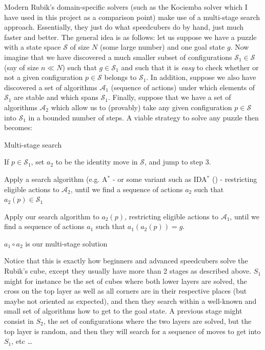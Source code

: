 \label{Theory:RCMSS}
Modern Rubik's domain-specific solvers (such as the Kociemba solver which I have used in this project as a comparison point) make use of a multi-stage search approach. Essentially, they just do what speedcubers do by hand, just much faster and better. The general idea is as follows: let us suppose we have a puzzle with a state space $\mathcal{S}$ of size $N$ (some large number) and one goal state $g$. Now imagine that we have discovered a much smaller subset of configurations $\mathcal{S}_{1} \in \mathcal{S}$ (say of size $n \ll N$) such that $g \in \mathcal{S}_{1}$ and such that it is \textit{easy} to check whether or not a given configuration $p \in \mathcal{S}$ belongs to $\mathcal{S}_{1}$. In addition, suppose we also have discovered a set of algorithms $\mathcal{A}_{1}$ (sequence of actions) under which elements of $\mathcal{S}_{1}$ are stable and which spans $\mathcal{S}_{1}$. Finally, suppose that we have a set of algorithms $\mathcal{A}_{2}$ which allow us to (provably) take any given configuration $p \in \mathcal{S}$ into $\mathcal{S}_{1}$ in a bounded number of steps. A viable strategy to solve any puzzle then becomes:
\begin{titlemize}{Multi-stage search}
\item If $p \in \mathcal{S}_{1}$, set $a_{2}$ to be the identity move in $\mathcal{S}$, and jump to step 3.
\item Apply a search algorithm (e.g. A$^{*}$ - or some variant such as IDA$^{*}$ (\cite{IDAWiki}) - restricting eligible actions to $\mathcal{A}_{2}$, until we find a sequence of actions $a_{2}$ such that $a_{2}(p) \in \mathcal{S}_{1}$
\item Apply our search algorithm to $a_{2}(p)$, restricting eligible actions to $\mathcal{A}_{1}$, until we find a sequence of actions $a_{1}$ such that $a_{1}(a_{2}(p)) = g$.
\item $a_{1} \circ a_{2}$ is our multi-stage solution
\end{titlemize}
Notice that this is exactly how beginners and advanced speedcubers solve the Rubik's cube, except they usually have more than 2 stages as described above. $S_{1}$ might for instance be the set of cubes where both lower layers are solved, the cross on the top layer as well as all corners are in their respective places (but maybe not oriented as expected), and then they search within a well-known and small set of algorithms how to get to the goal state. A previous stage might consist in $S_{2}$, the set of configurations where the two layers are solved, but the top layer is random, and then they will search for a sequence of moves to get into $S_{1}$, etc \dots


